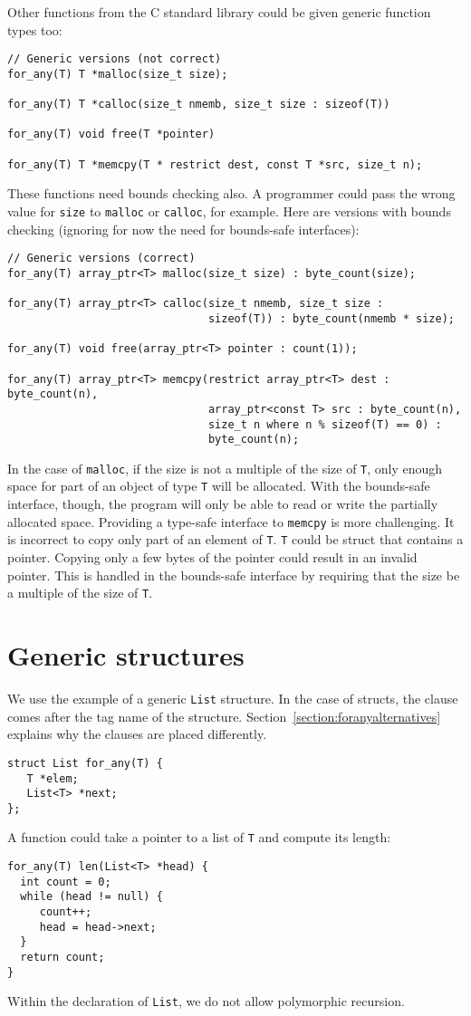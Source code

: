 Other functions from the C standard library could be given generic function types too:
\begin{lstlisting}
// Generic versions (not correct)
for_any(T) T *malloc(size_t size);

for_any(T) T *calloc(size_t nmemb, size_t size : sizeof(T))

for_any(T) void free(T *pointer)

for_any(T) T *memcpy(T * restrict dest, const T *src, size_t n);
\end{lstlisting}
These functions need bounds checking also.  A programmer
could pass the wrong value for \lstinline+size+ to \lstinline+malloc+
or \lstinline+calloc+, for example.  Here are
versions with bounds checking (ignoring for now the need for bounds-safe interfaces):
\begin{lstlisting}
// Generic versions (correct)
for_any(T) array_ptr<T> malloc(size_t size) : byte_count(size);

for_any(T) array_ptr<T> calloc(size_t nmemb, size_t size : 
                               sizeof(T)) : byte_count(nmemb * size);

for_any(T) void free(array_ptr<T> pointer : count(1));

for_any(T) array_ptr<T> memcpy(restrict array_ptr<T> dest : byte_count(n),
                               array_ptr<const T> src : byte_count(n),
                               size_t n where n % sizeof(T) == 0) :
                               byte_count(n);
\end{lstlisting}
In the case of \lstinline+malloc+, if the size is not a multiple of the size of \lstinline+T+,
only enough space for part of an object of type \lstinline+T+ will be allocated.  With the 
bounds-safe interface, though, the program will only be able to read or write the 
partially allocated space.   Providing a type-safe interface to \lstinline+memcpy+
is more challenging.   It is incorrect to copy only part of an element of \lstinline+T+.
\lstinline+T+ could be struct that contains a pointer.  Copying only a few bytes
of the pointer could result in an invalid pointer.
This is handled in the bounds-safe interface by requiring that the
size be a multiple of the size of \lstinline+T+.

\section{Generic structures}
We use the example of a generic \lstinline+List+ structure.   In the case of structs,
the \forany{} clause comes after the tag name of the structure.  
Section~\ref{section:foranyalternatives} explains why the \forany{} clauses 
are placed differently.
\begin{lstlisting}
struct List for_any(T) { 
   T *elem;
   List<T> *next;
};
\end{lstlisting}
A function could take a pointer to a list of \lstinline+T+ and compute its length:
\begin{lstlisting}
for_any(T) len(List<T> *head) {
  int count = 0;
  while (head != null) {
     count++;
     head = head->next;
  }
  return count;
}
\end{lstlisting}
Within the declaration of \lstinline+List+, we do not allow polymorphic recursion.

